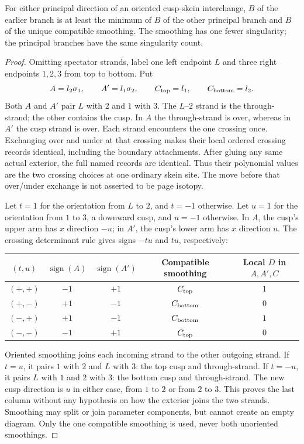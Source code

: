 \begin{lemma}\label{ng:cusp-skein}
For either principal direction of an oriented cusp-skein interchange,
$B$ of the earlier branch is at least the minimum of $B$ of the other
principal branch and $B$ of the unique compatible smoothing. The
smoothing has one fewer singularity; the principal branches have the
same singularity count.
\end{lemma}
\begin{proof}
Omitting spectator strands, label one left endpoint $L$ and three
right endpoints $1,2,3$ from top to bottom. Put
\begin{equation}\label{ng:cusp-words}
 A=l_2\sigma_1,\qquad A'=l_1\sigma_2,\qquad
 C_{\rm top}=l_1,\qquad C_{\rm bottom}=l_2.
\end{equation}
Both $A$ and $A'$ pair $L$ with $2$ and $1$ with $3$. The $L$--$2$
strand is the through-strand; the other contains the cusp. In $A$ the
through-strand is over, whereas in $A'$ the cusp strand is over.
Each strand encounters the one crossing once. Exchanging over and under
at that crossing makes their local ordered crossing records identical,
including the boundary attachments. After gluing any same actual
exterior, the full named records are identical. Thus their polynomial
values are the two crossing choices at one ordinary skein site. The
move before that over/under exchange is not asserted to be page isotopy.

Let $t=1$ for the orientation from $L$ to $2$, and $t=-1$ otherwise.
Let $u=1$ for the orientation from $1$ to $3$, a downward cusp, and
$u=-1$ otherwise. In $A$, the cusp's upper arm has $x$ direction $-u$;
in $A'$, the cusp's lower arm has $x$ direction $u$. The crossing
determinant rule gives signs $-tu$ and $tu$, respectively:
\begin{center}
\begin{tabular}{@{}ccccc@{}}
$(t,u)$ & $\operatorname{sign}(A)$ & $\operatorname{sign}(A')$
 & Compatible smoothing & Local $D$ in $A,A',C$\\
\hline
$(+,+)$ & $-1$ & $+1$ & $C_{\rm top}$    & $1$\\
$(+,-)$ & $+1$ & $-1$ & $C_{\rm bottom}$ & $0$\\
$(-,+)$ & $+1$ & $-1$ & $C_{\rm bottom}$ & $1$\\
$(-,-)$ & $-1$ & $+1$ & $C_{\rm top}$    & $0$
\end{tabular}
\end{center}
Oriented smoothing joins each incoming strand to the other outgoing
strand. If $t=u$, it pairs $1$ with $2$ and $L$ with $3$: the top cusp
and through-strand. If $t=-u$, it pairs $L$ with $1$ and $2$ with $3$:
the bottom cusp and through-strand. The new cusp direction is $u$ in
either case, from $1$ to $2$ or from $2$ to $3$. This proves the last
column without any hypothesis on how the exterior joins the two strands.
Smoothing may split or join parameter components, but cannot create an
empty diagram. Only the one compatible smoothing is used, never both
unoriented smoothings.


\end{proof}
